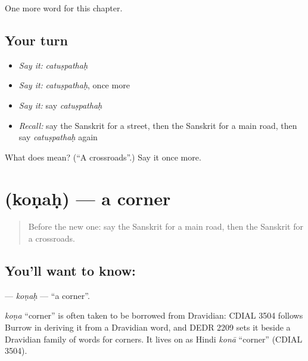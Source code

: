 \begin{grammarlens}[title={What you've built}]
One more word for this chapter.
\end{grammarlens}

\subsection*{Your turn}
\begin{itemize}
\raggedright
  \item \emph{Say it:} \emph{catuṣpathaḥ}
  \item \emph{Say it:} \emph{catuṣpathaḥ}, once more
  \item \emph{Say it:} say \emph{catuṣpathaḥ}
  \item \emph{Recall:} say the Sanskrit for a street, then the Sanskrit for a main road, then say \emph{catuṣpathaḥ} again
\end{itemize}

\begin{tcolorbox}[breakable,colback=teal!4,colframe=teal!35!black,title={Before you move on}]
What does  mean? (\textquotedblleft{}A crossroads\textquotedblright{}.) Say it once more.
\end{tcolorbox}
\section[\texorpdfstring{\sk{कोणः} (koṇaḥ)}{कोणः (koṇaḥ)}]{ (koṇaḥ) — a corner}

\label{lesson:SA-C96-konah}



\begin{quote}
Before the new one: say the Sanskrit for a main road, then the Sanskrit for a crossroads.
\end{quote}

\subsection*{You'll want to know: }
\textbf{} — \emph{koṇaḥ} — \textquotedblleft{}a corner\textquotedblright{}.

\begin{cousinweb}
\emph{koṇa} \textquotedblleft{}corner\textquotedblright{} is often taken to be borrowed from Dravidian: CDIAL 3504 follows Burrow in deriving it from a Dravidian word, and DEDR 2209 sets it beside a Dravidian family of words for corners. It lives on as Hindi \emph{konā} \textquotedblleft{}corner\textquotedblright{} (CDIAL 3504).
\end{cousinweb}

